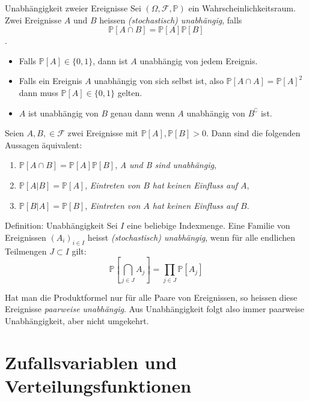 \documentclass[a4paper,10pt]{article}
\def\P{\mathbb{P}}
\begin{document}
\begin{mainbox}{Unabhängigkeit zweier Ereignisse}
    Sei \( (\Omega, \mathcal{F}, \P) \) ein Wahrscheinlichkeitsraum. Zwei Ereignisse \( A \) und \( B \) heissen \emph{(stochastisch) unabhängig}, falls \[ \P[A \cap B] = \P[A] \P[B] \].
\end{mainbox}

\begin{itemize}
    \item Falls \( \P[A] \in \{0, 1\} \), dann ist \( A \) unabhängig von jedem Ereignis.
    \item Falls ein Ereignis \( A \) unabhängig von sich selbst ist, also \( \P[A \cap A] = \P[A]^2 \) dann muss \( \P[A] \in \{0, 1\} \) gelten.
    \item \( A \) ist unabhängig von \( B \) genau dann wenn \( A \) unabhängig von \( B^\complement \) ist.
\end{itemize}

\begin{subbox}{}
    Seien \( A, B, \in \mathcal{F} \) zwei Ereignisse mit \( \P[A], \P[B] > 0 \). Dann sind die folgenden Aussagen äquivalent:
    \begin{enumerate}
        \item \( \P[A \cap B] = \P[A] \P[B] \), \emph{A und B sind unabhängig},
        \item \( \P[A | B] = \P[A] \), \emph{Eintreten von \( B \) hat keinen Einfluss auf \( A \)},
        \item \( \P[B | A] = \P[B] \), \emph{Eintreten von \( A \) hat keinen Einfluss auf \( B \)}.
    \end{enumerate}
\end{subbox}

\begin{mainbox}{Definition: Unabhängigkeit}
    Sei \( I \) eine beliebige Indexmenge. Eine Familie von Ereignissen \( (A_i)_{i \in I} \) heisst \emph{(stochastisch) unabhängig}, wenn für alle endlichen Teilmengen \( J \subset I \) gilt:
    \[ \P \left[ \bigcap_{j \in J} A_j \right] = \prod_{j \in J} \P \left[ A_j \right] \]
\end{mainbox}

Hat man die Produktformel nur für alle Paare von Ereignissen, so heissen diese Ereignisse \emph{paarweise unabhängig}. Aus Unabhängigkeit folgt also immer paarweise Unabhängigkeit, aber nicht umgekehrt.


\section{Zufallsvariablen und Verteilungsfunktionen}
\end{document}
